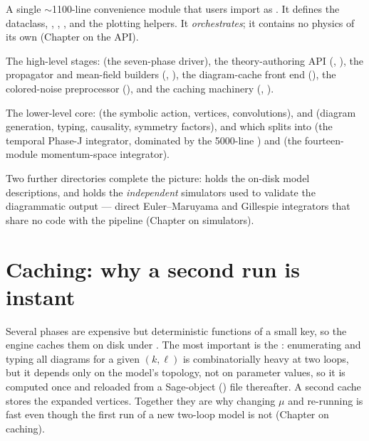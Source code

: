 \begin{description}[style=nextline,leftmargin=1.2em]
  \item[\file{notebooks/daedalus.py} --- the engine API] A single
        $\sim$1100-line convenience module that users import as .  It
        defines the  dataclass, , ,
        , and the plotting helpers.  It \emph{orchestrates};
        it contains no physics of its own (Chapter on the API).
  \item[\file{pipeline/} --- orchestration] The high-level stages:
         (the seven-phase driver), the theory-authoring API
        (, ), the propagator and
        mean-field builders (, ),
        the diagram-cache front end (), the colored-noise
        preprocessor (), and the caching
        machinery (, ).
  \item[\file{msrjd/} --- the mathematical engine] The lower-level core:
         (the symbolic action, vertices, convolutions),
         and  (diagram generation, typing,
        causality, symmetry factors), and  which splits into
         (the temporal Phase-J integrator, dominated by the
        5000-line ) and  (the
        fourteen-module momentum-space integrator).
\end{description}

Two further directories complete the picture:  holds the on-disk
 model descriptions, and  holds the
\emph{independent} simulators used to validate the diagrammatic output --- direct
Euler--Maruyama and Gillespie integrators that share no code with the pipeline
(Chapter on simulators).

\section{Caching: why a second run is instant}

Several phases are expensive but deterministic functions of a small key, so the
engine caches them on disk under .  The most
important is the : enumerating and typing all
diagrams for a given $(k,\ell)$ is combinatorially heavy at two loops, but it
depends only on the model's topology, not on parameter values, so it is computed
once and reloaded from a Sage-object () file thereafter.  A second
cache stores the expanded vertices.  Together they are why changing
$\mu$ and re-running is fast even though the first run of a new two-loop model is
not (Chapter on caching).


